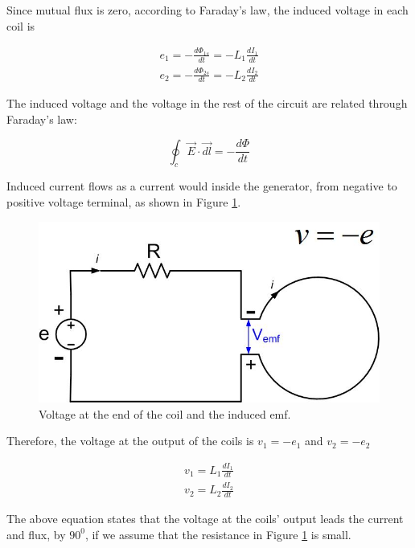 \documentclass{ximera}
\begin{document}
Since mutual flux is zero, according to Faraday's law, the induced voltage in each coil is

\begin{eqnarray}
e_1=-\frac{d\Phi_{1s}}{dt} = - L_1 \frac{dI_1}{dt}\\
e_2=-\frac{d\Phi_{2s}}{dt} = - L_2 \frac{dI_2}{dt}
\end{eqnarray}

The induced voltage and the voltage in the rest of the circuit are related through Faraday's law:

\begin{equation}
\oint_c \vec{E} \cdot \vec{dl} =  - \frac{d\Phi}{dt}
\end{equation}

Induced current flows as a current would inside the generator, from negative to positive voltage terminal, as shown in Figure \ref{fig:InducedEMF}.



\begin{figure}[htbp]
\begin{center}
\includegraphics[scale=0.5]{../jpg/Loop_Inductance.jpg}
\end{center}
\caption{Voltage at the end of the coil and the induced emf.}
\label{fig:InducedEMF}
\end{figure}


 Therefore,
the voltage at the output of the coils is $v_1=-e_1$ and $v_2=-e_2$

\begin{eqnarray}
v_1= L_1 \frac{dI_1}{dt} \\
v_2= L_2 \frac{dI_2}{dt}
\end{eqnarray}



The above equation states that the voltage at the coils' output leads the current and flux, by $90^0$, if we assume that the resistance in Figure \ref{fig:InducedEMF} is small.
\end{document}
